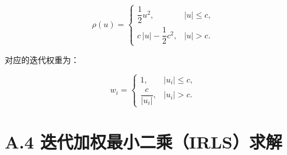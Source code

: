 \documentclass[UTF8,a4paper,11pt]{ctexart}
\begin{document}
\begin{equation}
\rho(u) =
\begin{cases}
\dfrac{1}{2} u^2, & \vert u \vert \le c, \\[6pt]
c\,\vert u \vert - \dfrac{1}{2} c^2, & \vert u \vert > c.
\end{cases}
\end{equation}

对应的迭代权重为：

\begin{equation}
w_i =
\begin{cases}
1, & \vert u_i \vert \le c, \\[6pt]
\dfrac{c}{\vert u_i \vert}, & \vert u_i \vert > c.
\end{cases}
\end{equation}

{}
\section*{A.4 迭代加权最小二乘（IRLS）求解}
\end{document}
